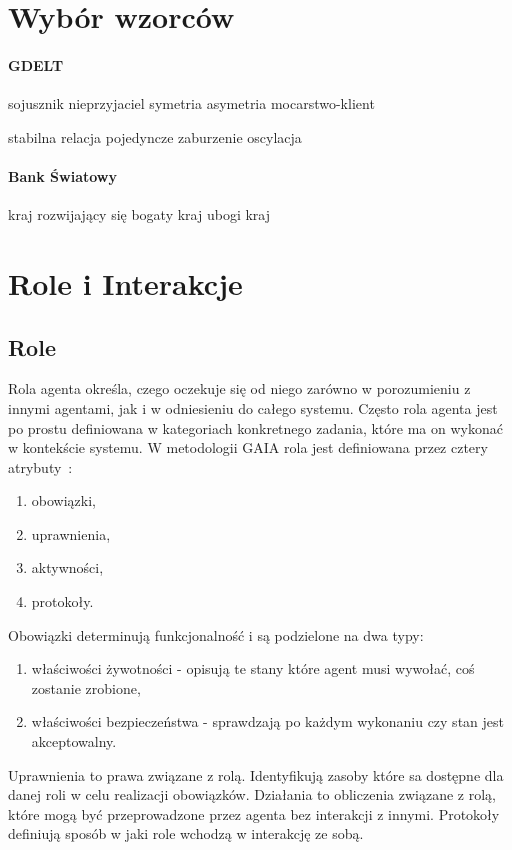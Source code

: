 \documentclass[11pt]{report}
\begin{document}
    \section{Wybór wzorców}

    \paragraph{GDELT}

    sojusznik
    nieprzyjaciel
    symetria
    asymetria
    mocarstwo-klient

    stabilna relacja
    pojedyncze zaburzenie
    oscylacja

    \paragraph{Bank Światowy}

    kraj rozwijający się
    bogaty kraj
    ubogi kraj


    \section{Role i Interakcje}

    \subsection{Role}
    Rola agenta określa, czego oczekuje się od niego zarówno w porozumieniu z innymi agentami, jak i w odniesieniu do całego systemu.
    Często rola agenta jest po prostu definiowana w kategoriach konkretnego zadania, które ma on wykonać w kontekście systemu.
    W metodologii GAIA rola jest definiowana przez cztery atrybuty~\cite{Wooldridge2000a}:
    \begin{enumerate}
        \item obowiązki,
        \item uprawnienia,
        \item aktywności,
        \item protokoły.
    \end{enumerate}
    Obowiązki determinują funkcjonalność i są podzielone na dwa typy:
    \begin{enumerate}
        \item właściwości żywotności - opisują te stany które agent musi wywołać, coś zostanie zrobione,
        \item właściwości bezpieczeństwa - sprawdzają po każdym wykonaniu czy stan jest akceptowalny.
    \end{enumerate}
    Uprawnienia to prawa związane z rolą.
    Identyfikują zasoby które sa dostępne dla danej roli w celu realizacji obowiązków.
    Działania to obliczenia związane z rolą, które mogą być przeprowadzone przez agenta bez interakcji z innymi.
    Protokoły definiują sposób w jaki role wchodzą w interakcję ze sobą.
\end{document}
